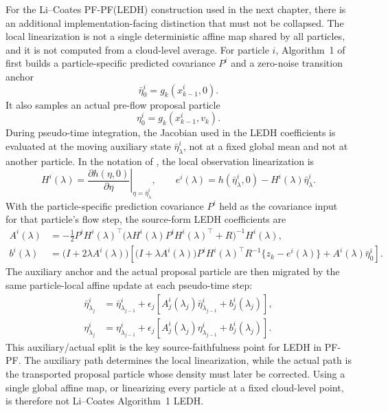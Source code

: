 For the Li--Coates PF-PF(LEDH) construction used in the next chapter,
there is an additional implementation-facing distinction that must not be
collapsed.  The local linearization is not a single deterministic affine map
shared by all particles, and it is not computed from a cloud-level average.
For particle $i$, Algorithm~1 of \citet{li2017particle} first builds a
particle-specific predicted covariance $P^i$ and a zero-noise transition anchor
\[
  \bar\eta_0^i = g_k(x_{k-1}^i,0).
\]
It also samples an actual pre-flow proposal particle
\[
  \eta_0^i = g_k(x_{k-1}^i,v_k).
\]
During pseudo-time integration, the Jacobian used in the LEDH coefficients is
evaluated at the moving auxiliary state $\bar\eta^i_\lambda$, not at a fixed
global mean and not at another particle.  In the notation of
\citet{li2017particle}, the local observation linearization is
\begin{equation}
\label{eq:bf-pff-li-coates-local-jacobian}
  H^i(\lambda)
  =
  \left.
  \frac{\partial h(\eta,0)}{\partial \eta}
  \right|_{\eta=\bar\eta^i_\lambda},
  \qquad
  e^i(\lambda)
  =
  h(\bar\eta^i_\lambda,0)-H^i(\lambda)\bar\eta^i_\lambda .
\end{equation}
With the particle-specific prediction covariance $P^i$ held as the covariance
input for that particle's flow step, the source-form LEDH coefficients are
\begin{align}
\label{eq:bf-pff-li-coates-ledh-A}
  A^i(\lambda)
  &=
  -\frac{1}{2}
  P^i H^i(\lambda)^\top
  \bigl(\lambda H^i(\lambda)P^iH^i(\lambda)^\top+R\bigr)^{-1}
  H^i(\lambda), \\
\label{eq:bf-pff-li-coates-ledh-b}
  b^i(\lambda)
  &=
  \bigl(I+2\lambda A^i(\lambda)\bigr)
  \left[
    \bigl(I+\lambda A^i(\lambda)\bigr)
    P^i H^i(\lambda)^\top R^{-1}\{z_k-e^i(\lambda)\}
    + A^i(\lambda)\bar\eta_0^i
  \right].
\end{align}
The auxiliary anchor and the actual proposal particle are then migrated by the
same particle-local affine update at each pseudo-time step:
\begin{align}
\label{eq:bf-pff-li-coates-aux-update}
  \bar\eta^i_{\lambda_j}
  &=
  \bar\eta^i_{\lambda_{j-1}}
  +\epsilon_j
  \left[
    A_j^i(\lambda_j)\bar\eta^i_{\lambda_{j-1}}
    +b_j^i(\lambda_j)
  \right],\\
\label{eq:bf-pff-li-coates-actual-update}
  \eta^i_{\lambda_j}
  &=
  \eta^i_{\lambda_{j-1}}
  +\epsilon_j
  \left[
    A_j^i(\lambda_j)\eta^i_{\lambda_{j-1}}
    +b_j^i(\lambda_j)
  \right].
\end{align}
This auxiliary/actual split is the key source-faithfulness point for LEDH in
PF-PF.  The auxiliary path determines the local linearization, while the actual
path is the transported proposal particle whose density must later be corrected.
Using a single global affine map, or linearizing every particle at a fixed
cloud-level point, is therefore not Li--Coates Algorithm~1 LEDH.

